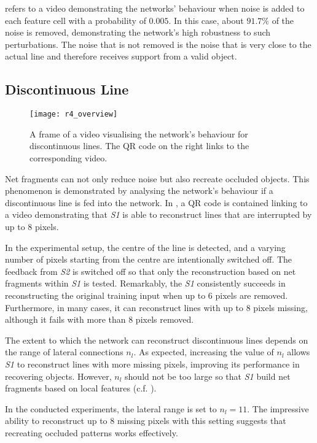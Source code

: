  refers to a video demonstrating the networks' behaviour when noise is added to each feature cell with a probability of $0.005$.
In this case, about $91.7\%$ of the noise is removed, demonstrating the network's high robustness to such perturbations.
The noise that is not removed is the noise that is very close to the actual line and therefore receives support from a valid object.

\subsection{Discontinuous Line}
%
\begin{figure}[h]
    \centering
    \texttt{[image: r4\_overview]}
    \caption[Video visualising the network's behaviour for discontinuous lines]{A frame of a video visualising the network's behaviour for discontinuous lines. The QR code on the right links to the corresponding video.}
\end{figure}
%
Net fragments  can not only reduce noise but also recreate occluded objects.
This phenomenon is demonstrated by analysing the network's behaviour if a discontinuous line is fed into the network.
In , a QR code is contained linking to a video demonstrating that \emph{S1} is able to reconstruct lines that are interrupted by up to $8$ pixels.

In the experimental setup, the centre of the line is detected, and a varying number of pixels starting from the centre are intentionally switched off.
The feedback from \emph{S2} is switched off so that only the reconstruction based on net fragments within \emph{S1} is tested.
Remarkably, the \emph{S1} consistently succeeds in reconstructing the original training input when up to $6$ pixels are removed. Furthermore, in many cases, it can reconstruct lines with up to $8$ pixels missing, although it fails with more than $8$ pixels removed.

The extent to which the network can reconstruct discontinuous lines depends on the range of lateral connections $n_l$. As expected, increasing the value of $n_l$ allows \emph{S1} to reconstruct lines with more missing pixels, improving its performance in recovering objects.
However, $n_l$ should not be too large so that \emph{S1} build net fragments based on local features (c.f. ).

In the conducted experiments, the lateral range is set to $n_l=11$.
The impressive ability to reconstruct up to $8$ missing pixels with this setting suggests that recreating occluded patterns works effectively.


